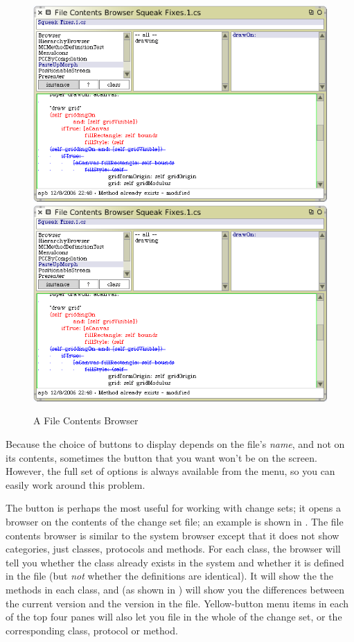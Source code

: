 \documentclass[a4paper,10pt,twoside]{book}
\begin{document}
\begin{figure}[btp]
	\begin{center}
	\ifluluelse
		{\includegraphics[width=\textwidth]{fileContentsBrowser}}
		{\includegraphics[scale=0.7]{fileContentsBrowser}}
	\end{center}
	\caption{A File Contents Browser}
	\label{fig:fileContentsBrowser}
\end{figure}

Because the choice of buttons to display depends on the file's \emph{name}, and not on its contents, sometimes the button that you want won't be on the screen.  
However, the full set of options is always available from the   menu, so
you can easily work around this problem.

The  button is perhaps the most useful for working with change sets; it opens a browser on the contents of the change set file; an example is shown in .
The file contents browser is similar to the system browser except that it does not show categories, just classes, protocols and methods.
For each class, the browser will tell you whether the class already exists in the system and whether it is defined in the file (but \emph{not} whether the definitions are identical).  
It will show the the methods in each class, and (as shown in ) will show you the differences between the current version and the version in the file.
Yellow-button menu items in each of the top four panes will also let you file in the whole of the change set, or the corresponding class, protocol or method. 
\end{document}
